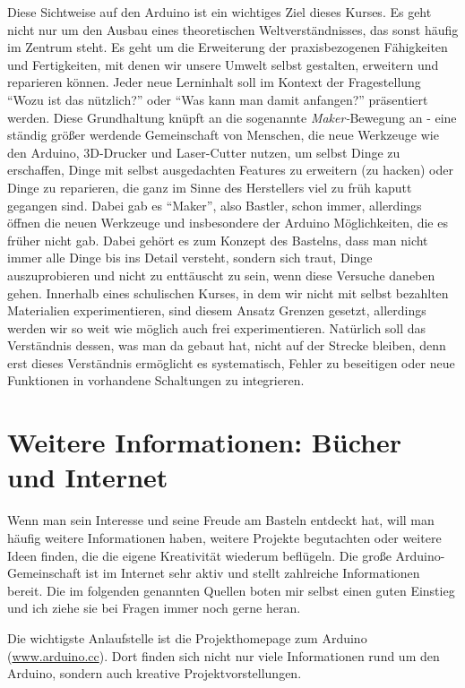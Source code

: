 Diese Sichtweise auf den Arduino ist ein wichtiges Ziel dieses Kurses. Es geht nicht nur um den Ausbau eines theoretischen Weltverständnisses, das sonst häufig im Zentrum steht. Es geht um die Erweiterung der praxisbezogenen Fähigkeiten und Fertigkeiten, mit denen wir unsere Umwelt selbst gestalten, erweitern und reparieren können. Jeder neue Lerninhalt soll im Kontext der Fragestellung \enquote{Wozu ist das nützlich?} oder \enquote{Was kann man damit anfangen?} präsentiert werden. Diese Grundhaltung knüpft an die sogenannte \emph{Maker-}Bewegung an - eine ständig größer werdende Gemeinschaft von Menschen, die neue Werkzeuge wie den Arduino, 3D-Drucker und Laser-Cutter nutzen, um selbst Dinge zu erschaffen, Dinge mit selbst ausgedachten Features zu erweitern (zu hacken) oder Dinge zu reparieren, die ganz im Sinne des Herstellers viel zu früh kaputt gegangen sind. Dabei gab es \enquote{Maker}, also Bastler, schon immer, allerdings öffnen die neuen Werkzeuge und insbesondere der Arduino Möglichkeiten, die es früher nicht gab. Dabei gehört es zum Konzept des Bastelns, dass man nicht immer alle Dinge bis ins Detail versteht, sondern sich traut, Dinge auszuprobieren und nicht zu enttäuscht zu sein, wenn diese Versuche daneben gehen. Innerhalb eines schulischen Kurses, in dem wir nicht mit selbst bezahlten Materialien experimentieren, sind diesem Ansatz Grenzen gesetzt, allerdings werden wir so weit wie möglich auch frei experimentieren. Natürlich soll das Verständnis dessen, was man da gebaut hat, nicht auf der Strecke bleiben, denn erst dieses Verständnis ermöglicht es systematisch, Fehler zu beseitigen oder neue Funktionen in vorhandene Schaltungen zu integrieren.

\section{Weitere Informationen: Bücher und Internet}

Wenn man sein Interesse und seine Freude am Basteln entdeckt hat, will man häufig weitere Informationen haben, weitere Projekte begutachten oder weitere Ideen finden, die die eigene Kreativität wiederum beflügeln. Die große Arduino-Gemeinschaft ist im Internet sehr aktiv und stellt zahlreiche Informationen bereit. Die im folgenden genannten Quellen boten mir selbst einen guten Einstieg und ich ziehe sie bei Fragen immer noch gerne heran.

Die wichtigste Anlaufstelle ist die Projekthomepage zum Arduino (\url{www.arduino.cc}). Dort finden sich nicht nur viele Informationen rund um den Arduino, sondern auch kreative Projektvorstellungen.

